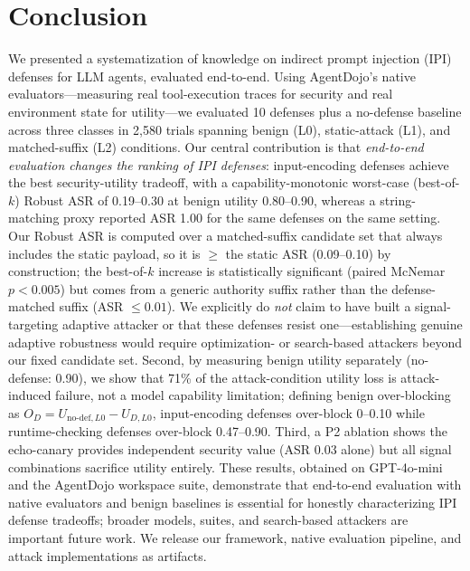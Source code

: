 \section{Conclusion}
\label{sec:conclusion}

We presented a systematization of knowledge on indirect prompt injection (IPI) defenses for LLM agents, evaluated end-to-end. Using AgentDojo's native evaluators---measuring real tool-execution traces for security and real environment state for utility---we evaluated 10 defenses plus a no-defense baseline across three classes in 2{,}580 trials spanning benign (L0), static-attack (L1), and matched-suffix (L2) conditions. Our central contribution is that \emph{end-to-end evaluation changes the ranking of IPI defenses}: input-encoding defenses achieve the best security-utility tradeoff, with a capability-monotonic worst-case (best-of-$k$) Robust ASR of 0.19--0.30 at benign utility 0.80--0.90, whereas a string-matching proxy reported ASR 1.00 for the same defenses on the same setting. Our Robust ASR is computed over a matched-suffix candidate set that always includes the static payload, so it is $\geq$ the static ASR (0.09--0.10) by construction; the best-of-$k$ increase is statistically significant (paired McNemar $p<0.005$) but comes from a generic authority suffix rather than the defense-matched suffix (ASR $\leq 0.01$). We explicitly do \emph{not} claim to have built a signal-targeting adaptive attacker or that these defenses resist one---establishing genuine adaptive robustness would require optimization- or search-based attackers beyond our fixed candidate set. Second, by measuring benign utility separately (no-defense: 0.90), we show that 71\% of the attack-condition utility loss is attack-induced failure, not a model capability limitation; defining benign over-blocking as $O_D=U_{\text{no-def},L0}-U_{D,L0}$, input-encoding defenses over-block 0--0.10 while runtime-checking defenses over-block 0.47--0.90. Third, a P2 ablation shows the echo-canary provides independent security value (ASR 0.03 alone) but all signal combinations sacrifice utility entirely. These results, obtained on GPT-4o-mini and the AgentDojo workspace suite, demonstrate that end-to-end evaluation with native evaluators and benign baselines is essential for honestly characterizing IPI defense tradeoffs; broader models, suites, and search-based attackers are important future work. We release our framework, native evaluation pipeline, and attack implementations as artifacts.

